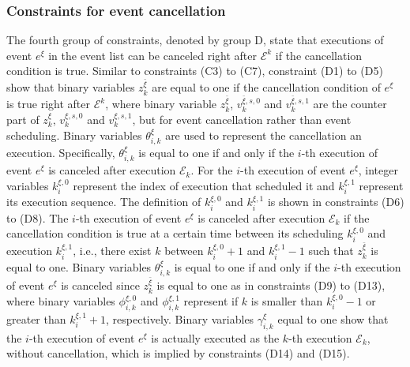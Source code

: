 \documentclass[]{interact}
\theoremstyle{plain}%
\theoremstyle{definition}
\theoremstyle{remark}
\begin{document}
\subsubsection{Constraints for event cancellation}
The fourth group of constraints, denoted by group D, state that executions of event $e^{\xi}$ in the event list can be canceled right after $\mathcal{E}^k$ if the cancellation condition is true. Similar to constraints (C3) to (C7), constraint (D1) to (D5) show that binary variables $z^{\bar{\xi}}_{k}$ are equal to one if the cancellation condition of $e^{\xi}$ is true right after $\mathcal{E}^k$, where binary variable $z^{\bar{\xi}}_{k}$, $v^{\bar{\xi},s,0}_k$ and $v^{\bar{\xi},s,1}_k$ are the counter part of $z^{\xi}_{k}$, $v^{\xi,s,0}_k$ and $v^{\xi,s,1}_k$, but for event cancellation rather than event scheduling. Binary variables $\theta^{\xi}_{i,k}$ are used to represent the cancellation an execution. Specifically, $\theta^{\xi}_{i,k}$ is equal to one if and only if the $i$-th execution of event $e^{\xi}$ is canceled after execution $\mathcal{E}_k$. For the $i$-th execution of event $e^{\xi}$, integer variables $k^{\xi,0}_i$ represent the index of execution that scheduled it and $k^{\xi,1}_i$ represent its execution sequence. The definition of $k^{\xi,0}_i$ and $k^{\xi,1}_i$ is shown in constraints (D6) to (D8). The $i$-th execution of event $e^{\xi}$ is canceled after execution $\mathcal{E}_k$ if the cancellation condition is true at a certain time between its scheduling $k^{\xi,0}_i$ and execution $k^{\xi,1}_i$, i.e., there exist $k$ between $k^{\xi,0}_i+1$ and $k^{\xi,1}_i-1$ such that $z^{\bar{\xi}}_{k}$ is equal to one. Binary variables $\theta^{\xi}_{i,k}$ is equal to one if and only if the $i$-th execution of event $e^{\xi}$ is canceled since $z^{\bar{\xi}}_{k}$ is equal to one as in constraints (D9) to (D13), where binary variables $\phi^{\xi,0}_{i,k}$ and $\phi^{\xi,1}_{i,k}$ represent if $k$ is smaller than $k^{\xi,0}_i-1$ or greater than $k^{\xi,1}_i+1$, respectively. Binary variables $\gamma^{\xi}_{i,k}$ equal to one show that the $i$-th execution of event $e^{\xi}$ is actually executed as the $k$-th execution $\mathcal{E}_k$, without cancellation, which is implied by constraints (D14) and (D15).
\end{document}
